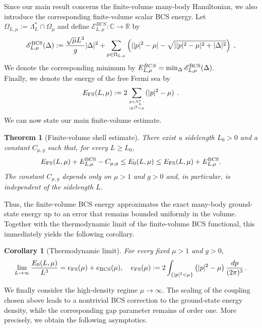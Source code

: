 \documentclass[11pt]{amsart}
\newtheorem{theorem}[definition]{Theorem}
\newtheorem{corollary}[definition]{Corollary}
\theoremstyle{definition}
\numberwithin{equation}{section}
\newcommand{\R}{\mathbb R}
\newcommand{\C}{\mathbb C}
\newcommand{\1}{\mathbf 1}
\begin{document}
Since our main result concerns the finite-volume many-body Hamiltonian, we also introduce the corresponding finite-volume scalar BCS energy. Let $\Omega_{L, \mu}:= \Lambda_L^* \cap \Omega_{\mu}$ and define $\mathscr {E}_{L,\mu}^{BCS}: \C \to \R$ by
\begin{equation}\label{eq:BCS-scalar-finite-vol}
    \mathscr{E}_{L,\mu}^{\rm BCS}(\Delta) := \frac{\sqrt{\mu}L^3}{g}|\Delta|^2 + \sum_{p \in \Omega_{L, \mu}}\left(||p|^2 - \mu| - \sqrt{||p|^2 - \mu|^2 + |\Delta|^2} \right)\;,
\end{equation}
We denote the corresponding minimum by $E_{L, \mu}^{BCS} = \min_{\Delta}\mathscr{E}_{L,\mu}^{\rm BCS}(\Delta)$.\\
Finally, we denote the energy of the free Fermi sea by
\begin{equation}
   E_{\rm FS}(L, \mu) := 2 \sum_{p \in \Lambda_L^*\,: \atop |p|^2 < \mu} (|p|^2 - \mu)\;\,.
\end{equation}
We can now state our main finite-volume estimate.
\begin{theorem}[Finite-volume shell estimate]\label{thm:main}
There exist a sidelength $L_0 > 0$ and a constant $C_{\mu, g}$ such that, for every $L \geq L_0$,
\begin{equation}\label{eq:main-general}
 E_{\rm FS}(L,\mu)+E^{\rm BCS}_{L,\mu} - C_{\mu, g}\le E_0(L,\mu)
 \le E_{\rm FS}(L,\mu)+E^{\rm BCS}_{L,\mu}.
\end{equation}
The constant $C_{\mu, g}$ depends only on $\mu > 1$ and $g > 0$ and, in particular, is independent of the sidelength $L$.
\end{theorem}
Thus, the finite-volume BCS energy approximates the exact many-body ground-state energy up to an error that remains bounded uniformly in the volume. Together with the thermodynamic limit of the finite-volume BCS functional, this immediately yields the following corollary.
\begin{corollary}[Thermodynamic limit]\label{cor:thermodynamic}
For every fixed \(\mu>1\) and \(g>0\),
\begin{equation}\label{eq:thermodynamic-limit}
 \lim_{L\to\infty}\frac{E_0(L,\mu)}{L^3}
 =
 e_{\rm FS}(\mu)+e_{\rm BCS}(\mu),
 \quad
 e_{\rm FS}(\mu)
 :=2\int_{\{|p|^2 < \mu\}}\left(|p|^2 - \mu \right)\frac{dp}{(2\pi)^3}\,.
\end{equation}
\end{corollary}
We finally consider the high-density regime $\mu \to \infty$. The scaling of the coupling chosen above leads to a nontrivial BCS correction to the ground-state energy density, while the corresponding gap parameter remains of order one. More precisely, we obtain the following asymptotics.
\end{document}
